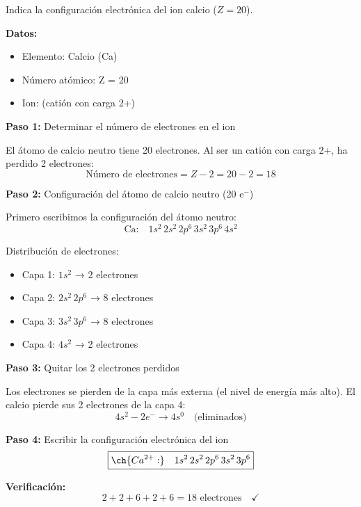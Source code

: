 \begin{exercise}
    Indica la configuración electrónica del ion calcio  (\( Z = 20 \)).
    \begin{solu}
        \textbf{Datos:}
        \begin{itemize}
            \item Elemento: Calcio (Ca)
            \item Número atómico: Z = 20
            \item Ion:  (catión con carga 2+)
        \end{itemize}

        \textbf{Paso 1:} Determinar el número de electrones en el ion

        El átomo de calcio neutro tiene 20 electrones. Al ser un catión con carga 2+, ha perdido 2 electrones:
        \[
            \text{Número de electrones} = Z - 2 = 20 - 2 = 18
        \]

        \textbf{Paso 2:} Configuración del átomo de calcio neutro (20 e\(^-\))

        Primero escribimos la configuración del átomo neutro:
        \[
            \text{Ca:} \quad 1s^2 \, 2s^2 \, 2p^6 \, 3s^2 \, 3p^6 \, 4s^2
        \]

        Distribución de electrones:
        \begin{itemize}
            \item Capa 1: \(1s^2\) → 2 electrones
            \item Capa 2: \(2s^2 \, 2p^6\) → 8 electrones
            \item Capa 3: \(3s^2 \, 3p^6\) → 8 electrones
            \item Capa 4: \(4s^2\) → 2 electrones
        \end{itemize}

        \textbf{Paso 3:} Quitar los 2 electrones perdidos

        Los electrones se pierden de la capa más externa (el nivel de energía más alto). El calcio pierde sus 2 electrones de la capa 4:
        \[
            4s^2 - 2e^- \rightarrow 4s^0 \quad \text{(eliminados)}
        \]

        \textbf{Paso 4:} Escribir la configuración electrónica del ion
        \[
            \boxed{\ch{Ca^{2+}:} \quad 1s^2 \, 2s^2 \, 2p^6 \, 3s^2 \, 3p^6}
        \]

        \textbf{Verificación:}
        \[
            2 + 2 + 6 + 2 + 6 = 18 \text{ electrones} \quad \checkmark
        \]


\end{solu}
\end{exercise}
